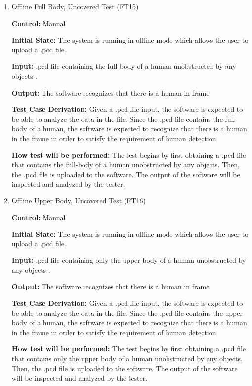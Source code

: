 \documentclass[12pt, titlepage]{article}
\begin{document}
\begin{enumerate}
  
\item{Offline Full Body, Uncovered Test (FT15)\label{FT15}\\}

\textbf{Control:} Manual

\textbf{Initial State:} The system is running in offline mode which allows the user to upload a .pcd file.

\textbf{Input:} .pcd file containing the full-body of a human unobstructed by any objects .

\textbf{Output:} The software recognizes that there is a human in frame

\textbf{Test Case Derivation:} Given a .pcd file input, the software is expected to be able to analyze the data in the file. Since the .pcd file contains the full-body of a human, the software is expected to recognize that there is a human in the frame in order to satisfy the requirement of human detection.

\textbf{How test will be performed:} The test begins by first obtaining a .pcd file that contains the full-body of a human unobstructed by any objects. Then, the .pcd file is uploaded to the software. The output of the software will be inspected and analyzed by the tester.

\item{Offline Upper Body, Uncovered Test (FT16)\label{FT16}\\}

\textbf{Control:} Manual

\textbf{Initial State:} The system is running in offline mode which allows the user to upload a .pcd file.

\textbf{Input:} .pcd file containing only the upper body of a human unobstructed by any objects .

\textbf{Output:} The software recognizes that there is a human in frame

\textbf{Test Case Derivation:} Given a .pcd file input, the software is expected to be able to analyze the data in the file. Since the .pcd file contains the upper body of a human, the software is expected to recognize that there is a human in the frame in order to satisfy the requirement of human detection.

\textbf{How test will be performed:} The test begins by first obtaining a .pcd file that contains only the upper body of a human unobstructed by any objects. Then, the .pcd file is uploaded to the software. The output of the software will be inspected and analyzed by the tester.


\end{enumerate}
\end{document}
